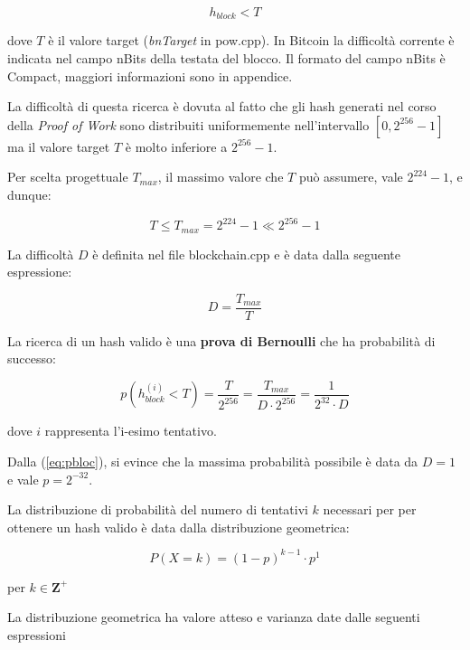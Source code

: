 \documentclass{book}
\theoremstyle{definition}
\begin{document}
\begin{equation}
    h_{block} < T \label{condizione_hash}
\end{equation}

dove $T$ è il valore target (\textit{bnTarget} in pow.cpp). In Bitcoin la difficoltà corrente è indicata nel campo nBits della testata del blocco.
Il formato del campo nBits è Compact, maggiori informazioni sono in appendice.

La difficoltà di questa ricerca è dovuta al fatto che gli hash generati nel corso della \textit{Proof of Work} sono distribuiti uniformemente nell'intervallo $ \left [0, 2^{256} - 1 \right ]$ ma il valore target $T$ è molto inferiore a $2^{256} - 1$. 

Per scelta progettuale $T_{max}$, il massimo valore che $T$ può assumere, vale $2^{224} - 1$, e dunque:

\begin{equation}
    T \le T_{max} = 2^{224} - 1 \ll 2^{256} - 1 \label{target_value}
\end{equation}

La difficoltà $D$ è definita nel file blockchain.cpp e è data dalla seguente espressione:

\begin{equation}
    D = \frac{T_{max}}{T} \label{diff}
\end{equation}

La ricerca di un hash valido è una \textbf{prova di Bernoulli} che ha probabilità di successo:

\begin{equation}
    \label{eq:pbloc}
    p(h_{block}^{(i)} < T) = \frac{T}{2^{256}} =\frac{T_{max}}{D \cdot 2^{256}} = \frac{1}{2^{32} \cdot D}
\end{equation}

dove $i$ rappresenta l'i-esimo tentativo.

Dalla (\ref{eq:pbloc}), si evince che la massima probabilità possibile è data da $D = 1$ e vale $p = 2^{-32}$.

La distribuzione di probabilità del numero di tentativi $k$ necessari per per ottenere un hash valido è data dalla distribuzione geometrica:

\begin{equation}
    P(X = k) = (1 - p)^{k-1} \cdot p^{1} \label{distribuzione_geometrica}
\end{equation}

per $k \in \mathbf{Z}^{+}$

La distribuzione geometrica ha valore atteso e varianza date dalle seguenti espressioni
\end{document}
